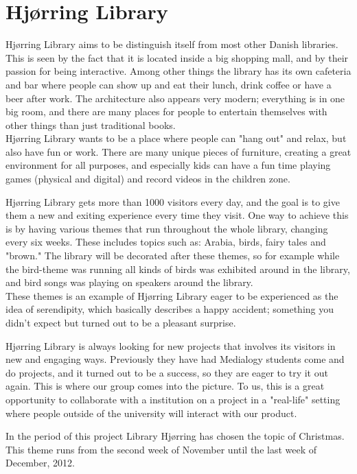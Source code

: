 \section{Hj{\o}rring Library}
Hj{\o}rring Library aims to be distinguish itself from most other Danish libraries. This is seen by the fact that it is located inside a big shopping mall, and by their passion for being interactive. Among other things the library has its own cafeteria and bar where people can show up and eat their lunch, drink coffee or have a beer after work. The architecture also appears very modern; everything is in one big room, and there are many places for people to entertain themselves with other things than just traditional books. \\ Hj{\o}rring Library wants to be a place where people can "hang out" and relax, but also have fun or work. There are many unique pieces of furniture, creating a great environment for all purposes, and especially kids can have a fun time playing games (physical and digital) and record videos in the children zone.

Hj{\o}rring Library gets more than 1000 visitors every day, and the goal is to give them a new and exiting experience every time they visit. One way to achieve this is by having various themes that run throughout the whole library, changing every six weeks. These includes topics such as: Arabia, birds, fairy tales and "brown." The library will be decorated after these themes, so for example while the bird-theme was running all kinds of birds was exhibited around in the library, and bird songs was playing on speakers around the library.\\
These themes is an example of Hj{\o}rring Library eager to be experienced as the idea of serendipity, which basically describes a happy accident; something you didn't expect but turned out to be a pleasant surprise.

Hj{\o}rring Library is always looking for new projects that involves its visitors in new and engaging ways. Previously they have had Medialogy students come and do projects, and it turned out to be a success, so they are eager to try it out again. This is where our group comes into the picture. To us, this is a great opportunity to collaborate with a institution on a project in a "real-life" setting where people outside of the university will interact with our product.

In the period of this project Library Hj{\o}rring has chosen the topic of Christmas. This theme runs from the second week of November until the last week of December, 2012.

